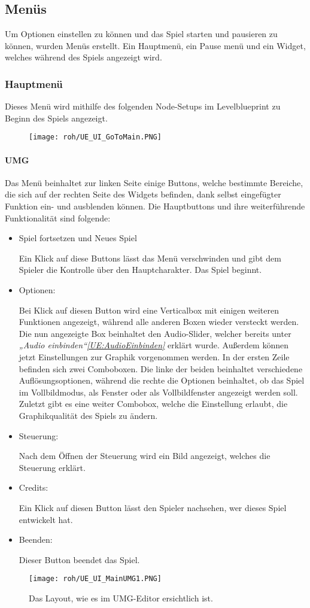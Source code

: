 \subsection{Menüs}
Um Optionen einstellen zu können und das Spiel starten und pausieren zu können, wurden Menüs erstellt. Ein Hauptmenü, ein Pause menü und ein Widget, welches während des Spiels angezeigt wird.
\subsubsection{Hauptmenü}
Dieses Menü wird mithilfe des folgenden Node-Setups im Levelblueprint zu Beginn des Spiels angezeigt.
\begin{figure}[H]
    \centering
    \texttt{[image: roh/UE\_UI\_GoToMain.PNG]}
    \label{UE:UI_GoToMain}
\end{figure}
\paragraph{UMG}
Das Menü beinhaltet zur linken Seite einige Buttons, welche bestimmte Bereiche, die sich auf der rechten Seite des Widgets befinden, dank selbst eingefügter Funktion ein- und ausblenden können.
Die Hauptbuttons und ihre weiterführende Funktionalität sind folgende:
\begin{itemize}
    \item Spiel fortsetzen und Neues Spiel

    Ein Klick auf diese Buttons lässt das Menü verschwinden und gibt dem Spieler die Kontrolle über den Hauptcharakter. Das Spiel beginnt.
    \item Optionen:

    Bei Klick auf diesen Button wird eine Verticalbox mit einigen weiteren Funktionen angezeigt, während alle anderen Boxen wieder versteckt werden. Die nun angezeigte Box beinhaltet den Audio-Slider, welcher bereits unter \textit{„Audio einbinden“\ref{UE:AudioEinbinden}} erklärt wurde. Außerdem können jetzt Einstellungen zur Graphik vorgenommen werden. In der ersten Zeile befinden sich zwei Comboboxen. Die linke der beiden beinhaltet verschiedene Auflösungsoptionen, während die rechte die Optionen beinhaltet, ob das Spiel im Vollbildmodus, als Fenster oder als Vollbildfenster angezeigt werden soll. Zuletzt gibt es eine weiter Combobox, welche die Einstellung erlaubt, die Graphikqualität des Spiels zu ändern.
    \item Steuerung:

    Nach dem Öffnen der Steuerung wird ein Bild angezeigt, welches die Steuerung erklärt.
    \item Credits:

    Ein Klick auf diesen Button lässt den Spieler nachsehen, wer dieses Spiel entwickelt hat.
    \item Beenden:

    Dieser Button beendet das Spiel.
\end{itemize}
\begin{figure}[H]
    \centering
    \texttt{[image: roh/UE\_UI\_MainUMG1.PNG]}
    \caption{Das Layout, wie es im UMG-Editor ersichtlich ist.}
    \label{UE:UI_MainUMG1}
\end{figure}
